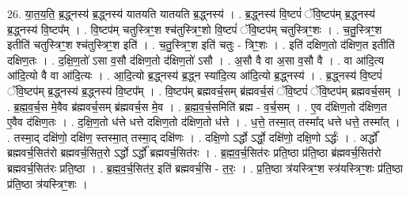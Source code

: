 \documentclass[17pt]{extarticle}
\begin{document}
26. या॒त॒य॒ति॒ ब्र॒द्ध्नस्य॑ ब्र॒द्ध्नस्य॑ यातयति यातयति ब्र॒द्ध्नस्य॑ । . ब्र॒द्ध्नस्य॑ वि॒ष्टपं॑ ॅवि॒ष्टप॑म् ब्र॒द्ध्नस्य॑ ब्र॒द्ध्नस्य॑ वि॒ष्टप᳚म् । . वि॒ष्टप॑म् चतुस्त्रिꣳ॒॒श श्च॑तुस्त्रिꣳ॒॒शो वि॒ष्टपं॑ ॅवि॒ष्टप॑म् चतुस्त्रिꣳ॒॒शः । . च॒तु॒स्त्रिꣳ॒॒श इतीति॑ चतुस्त्रिꣳ॒॒श श्च॑तुस्त्रिꣳ॒॒श इति॑ । . च॒तु॒स्त्रिꣳ॒॒श इति॑ चतुः - त्रिꣳ॒॒शः । . इति॑ दक्षिण॒तो द॑क्षिण॒त इतीति॑ दक्षिण॒तः । . द॒क्षि॒ण॒तो॑ ऽसा व॒सौ द॑क्षिण॒तो द॑क्षिण॒तो॑ ऽसौ । . अ॒सौ वै वा अ॒सा व॒सौ वै । . वा आ॑दि॒त्य आ॑दि॒त्यो वै वा आ॑दि॒त्यः । . आ॒दि॒त्यो ब्र॒द्ध्नस्य॑ ब्र॒द्ध्न स्या॑दि॒त्य आ॑दि॒त्यो ब्र॒द्ध्नस्य॑ । . ब्र॒द्ध्नस्य॑ वि॒ष्टपं॑ ॅवि॒ष्टप॑म् ब्र॒द्ध्नस्य॑ ब्र॒द्ध्नस्य॑ वि॒ष्टप᳚म् । . वि॒ष्टप॑म् ब्रह्मवर्च॒सम् ब्र॑ह्मवर्च॒सं ॅवि॒ष्टपं॑ ॅवि॒ष्टप॑म् ब्रह्मवर्च॒सम् । . ब्र॒ह्म॒व॒र्च॒स मे॒वैव ब्र॑ह्मवर्च॒सम् ब्र॑ह्मवर्च॒स मे॒व । . ब्र॒ह्म॒व॒र्च॒समिति॑ ब्रह्म - व॒र्च॒सम् । . ए॒व द॑क्षिण॒तो द॑क्षिण॒त ए॒वैव द॑क्षिण॒तः । . द॒क्षि॒ण॒तो ध॑त्ते धत्ते दक्षिण॒तो द॑क्षिण॒तो ध॑त्ते । . ध॒त्ते॒ तस्मा॒त् तस्मा᳚द् धत्ते धत्ते॒ तस्मा᳚त् । . तस्मा॒द् दक्षि॑णो॒ दक्षि॑ण॒ स्तस्मा॒त् तस्मा॒द् दक्षि॑णः । . दक्षि॒णो ऽर्द्धो ऽर्द्धो॒ दक्षि॑णो॒ दक्षि॒णो ऽर्द्धः॑ । . अर्द्धो᳚ ब्रह्मवर्च॒सित॑रो ब्रह्मवर्च॒सित॒रो ऽर्द्धो ऽर्द्धो᳚ ब्रह्मवर्च॒सित॑रः । . ब्र॒ह्म॒व॒र्च॒सित॑रः प्रति॒ष्ठा प्र॑ति॒ष्ठा ब्र॑ह्मवर्च॒सित॑रो ब्रह्मवर्च॒सित॑रः प्रति॒ष्ठा । . ब्र॒ह्म॒व॒र्च॒सित॑र॒ इति॑ ब्रह्मवर्च॒सि - त॒रः॒ । . प्र॒ति॒ष्ठा त्र॑यस्त्रिꣳ॒॒श स्त्र॑यस्त्रिꣳ॒॒शः प्र॑ति॒ष्ठा प्र॑ति॒ष्ठा त्र॑यस्त्रिꣳ॒॒शः । \newline
\end{document}
